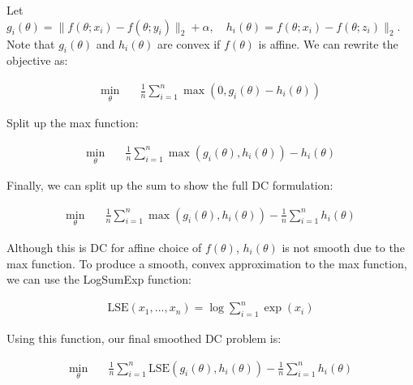 \documentclass[11pt]{article}
\begin{document}
Let $g_i(\theta) = \| f(\theta; x_i) - f(\theta; y_i)\|_2 + \alpha, \quad h_i(\theta) = f(\theta; x_i) - f(\theta; z_i)\|_2$. Note that $g_i(\theta)$ and $h_i(\theta)$ are convex if $f(\theta)$ is affine. We can rewrite the objective as:

\begin{equation}
\begin{aligned}
    \min_{\theta} \quad & \frac{1}{n} \sum_{i=1}^{n} \max(0, g_i(\theta) - h_i(\theta))
\end{aligned}
\end{equation}

Split up the max function:

\begin{equation}
\begin{aligned}
    \min_{\theta} \quad & \frac{1}{n} \sum_{i=1}^{n} \max(g_i(\theta), h_i(\theta)) - h_i(\theta)
\end{aligned}
\end{equation}

Finally, we can split up the sum to show the full DC formulation:

\begin{equation}
\begin{aligned}
    \min_{\theta} \quad & \frac{1}{n} \sum_{i=1}^{n} \max(g_i(\theta), h_i(\theta)) - \frac{1}{n} \sum_{i=1}^{n} h_i(\theta)
\end{aligned}
\end{equation}

Although this is DC for affine choice of $f(\theta)$, $h_i(\theta)$ is not smooth due to the max function. To produce a smooth, convex approximation to the max function, we can use the LogSumExp function:

\begin{equation}
\begin{aligned}
\textrm{LSE}(x_1, ..., x_n) = \log\sum_{i=1}^{n} \exp(x_i)
\end{aligned}
\end{equation}

Using this function, our final smoothed DC problem is:

\begin{equation}
\begin{aligned}
    \min_{\theta} \quad & \frac{1}{n} \sum_{i=1}^{n} \textrm{LSE}(g_i(\theta), h_i(\theta)) - \frac{1}{n} \sum_{i=1}^{n} h_i(\theta)
\end{aligned}
\end{equation}
\end{document}
